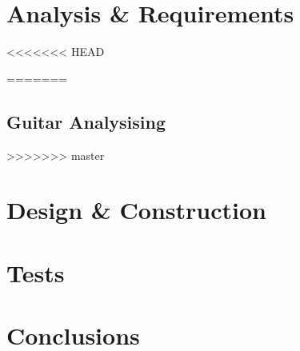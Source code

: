 %
\part{Analysis \& Requirements}\label{pt:analysis} \glsresetall
<<<<<<< HEAD

=======
 \graphicspath{{figures/analysing/}}
 \chapter{Guitar Analysising}\label{ch:analysing}
 
>>>>>>> master
\part{Design \& Construction}\label{pt:design} 
 
%
\part{Tests}\label{pt:tests} 
\part{Conclusions}\label{pt:conclusions} 
%

